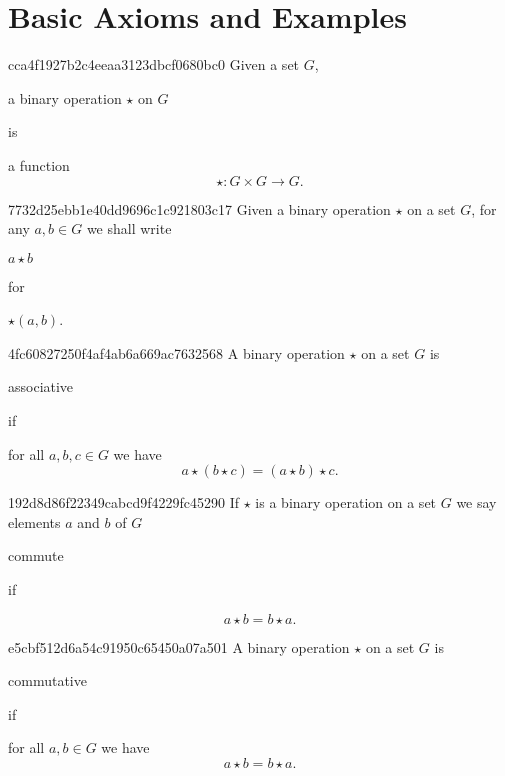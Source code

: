 


\section{Basic Axioms and Examples}
\begin{note}{cca4f1927b2c4eeaa3123dbcf0680bc0}
    Given a set \({ G }\), \begin{icloze}{2}a binary operation \({ \star }\) on \({ G }\)\end{icloze} is
    \begin{icloze}{1}
        a function
        \[
            \star : G \times G \to G.
        \]
    \end{icloze}
\end{note}

\begin{note}{7732d25ebb1e40dd9696c1c921803c17}
    Given a binary operation \({ \star }\) on a set \({ G }\),
    for any \({ a, b \in G }\) we shall write \begin{icloze}{2}\({ a \star b }\)\end{icloze} for \begin{icloze}{1}\({ \star(a, b) }\).\end{icloze}
\end{note}

\begin{note}{4fc60827250f4af4ab6a669ac7632568}
    A binary operation \({ \star }\) on a set \({ G }\) is \begin{icloze}{2}associative\end{icloze} if
    \begin{icloze}{1}
        for all \({ a, b, c \in G }\) we have
        \[
            a \star (b \star c) = (a \star b) \star c.
        \]
    \end{icloze}
\end{note}

\begin{note}{192d8d86f22349cabcd9f4229fc45290}
    If \({ \star }\) is a binary operation on a set \({ G }\) we say elements \({ a }\) and \({ b }\) of \({ G }\) \begin{icloze}{1}commute\end{icloze} if
    \begin{icloze}{2}
        \[
            a \star b = b \star a.
        \]
    \end{icloze}
\end{note}

\begin{note}{e5cbf512d6a54c91950c65450a07a501}
    A binary operation \({ \star }\) on a set \({ G }\) is \begin{icloze}{2}commutative\end{icloze} if
    \begin{icloze}{1}
        for all \({ a, b \in G }\) we have
        \[
            a \star b = b \star a.
        \]
    \end{icloze}
\end{note}

